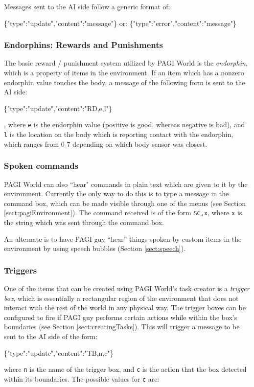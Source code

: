 Messages sent to the AI side follow a generic format of:
\begin{center}
\scriptsize{\{"type":"update","content":"message"\}}
or:
\scriptsize{\{"type":"error","content":"message"\}}
\end{center}

\subsubsection{Endorphins: Rewards and Punishments}

The basic reward / punishment system utilized by PAGI World is the \textit{endorphin}, which is a property of items in the environment. If an item which has a nonzero endorphin value touches the body, a message of the following form is sent to the AI side:
\begin{center}
\scriptsize{\{"type":"update","content":"RD,e,l"\}}
\end{center}
, where \texttt{e} is the endorphin value (positive is good, whereas negative is bad), and \texttt{l} is the location on the body which is reporting contact with the endorphin, which ranges from 0-7 depending on which body sensor was closest.

\subsubsection{Spoken commands}

PAGI World can also ``hear" commands in plain text which are given to it by the environment. Currently the only way to do this is to type a message in the command box, which can be made visible through one of the menus (see Section \ref{sect:pagiEnvironment}). The command received is of the form \texttt{SC,x}, where \texttt{x} is the string which was sent through the command box. 

An alternate is to have PAGI guy ``hear'' things spoken by custom items in the environment by using speech bubbles (Section \ref{sect:speech}).

\subsubsection{Triggers}

One of the items that can be created using PAGI World's task creator is a \textit{trigger box}, which is essentially a rectangular region of the environment that does not interact with the rest of the world in any physical way. The trigger boxes can be configured to fire if PAGI guy performs certain actions while within the box's boundaries (see Section \ref{sect:creatingTasks}). This will trigger a message to be sent to the AI side of the form:
\begin{center}
	\scriptsize{\{"type":"update","content":"TB,n,c"\}}
\end{center}
 where \texttt{n} is the name of the trigger box, and \texttt{c} is the action that the box detected within its boundaries. The possible values for \texttt{c} are:

